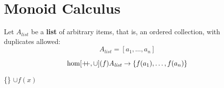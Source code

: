 \section{\color{Red}Monoid Calculus}


Let $A_{\mathit{list}}$ be a \textbf{list} of arbitrary items, that is, an ordered collection, with duplicates allowed: $$A_{\mathit{list}} = [a_1, \ldots, a_n]$$


\begin{equation}
\mathrm{hom}[\pp,\cup](f)A_{\mathit{list}}\rightarrow\{f(a_1),\ldots,f(a_n)\}
\end{equation}


\begin{algorithm}
\centering
\begin{minipage}{1.85in}
  \Result \setto \{\}\;
  {\Result \setto \Result $\cup f(x)$ \;}
  \Return \Result \;
\end{minipage}
\end{algorithm}



